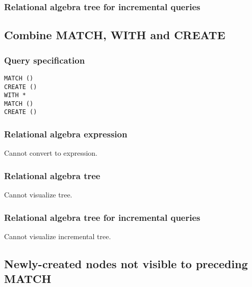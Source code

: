 
\subsubsection*{Relational algebra tree for incremental queries}


\subsection{Combine MATCH, WITH and CREATE}

\subsubsection*{Query specification}

\begin{lstlisting}
MATCH ()
CREATE ()
WITH *
MATCH ()
CREATE ()
\end{lstlisting}

\subsubsection*{Relational algebra expression}

Cannot convert to expression.

\subsubsection*{Relational algebra tree}

Cannot visualize tree.

\subsubsection*{Relational algebra tree for incremental queries}

Cannot visualize incremental tree.

\subsection{Newly-created nodes not visible to preceding MATCH}

